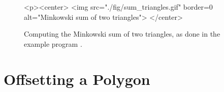\begin{figure}[t]
\begin{ccTexOnly}
  \begin{center}
  
  \end{center}
\end{ccTexOnly}
\begin{ccHtmlOnly}
  <p><center>
  <img src="./fig/sum_triangles.gif" border=0 alt="Minkowski sum of two triangles">
  </center>
\end{ccHtmlOnly}
\caption{Computing the Minkowski sum of two triangles, as done
in the example program .}
\label{mink_fig:sum_tri}
\end{figure}




\section{Offsetting a Polygon}
\label{mink_sec:offset}
